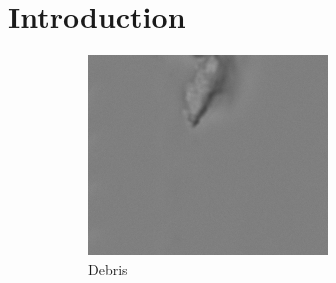 
\chapter{Introduction}
\label{sec:Introduction}

\label{sub:figures}
\begin{figure}[ht]
	\begin{center}
		\begin{subfigure}[b]{0.33\textwidth}
			\includegraphics[width=\textwidth]{thesis-template-master/images/(1095).png}
			\caption{Debris}
			\label{fig:Debris}
		\end{subfigure}
		\begin{subfigure}[b]{0.33\textwidth}

\end{subfigure}
\end{center}
\end{figure}
